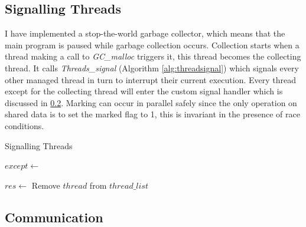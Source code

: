 \documentclass[../diss.tex]{subfiles}
\begin{document}
\subsection{Signalling Threads} \label{sec:signallingthreads}

I have implemented a stop-the-world garbage collector, which means that the main program is paused while garbage collection occurs. Collection starts when a thread making a call to \emph{GC\_malloc} triggers it, this thread becomes the collecting thread. It calls \emph{Threads\_signal} (Algorithm \ref{alg:threadsignal}) which signals every other managed thread in turn to interrupt their current execution. Every thread except for the collecting thread will enter the custom signal handler which is discussed in \cref{sec:communication}. Marking can occur in parallel safely since the only operation on shared data is to set the marked flag to 1, this is invariant in the presence of race conditions.

\begin{algorithm}
\caption{Signalling Threads}
\label{alg:threadsignal}
\begin{algorithmic}


\State $except\gets $ 

\State {}


        
        \State $res\gets$ 
            \State Remove $thread$ from $thread\_list$
        \EndIf
        
    \EndIf

\EndFor

\State {}

\EndFunction

\end{algorithmic}
\end{algorithm}


\subsection{Communication} \label{sec:communication}
\end{document}
